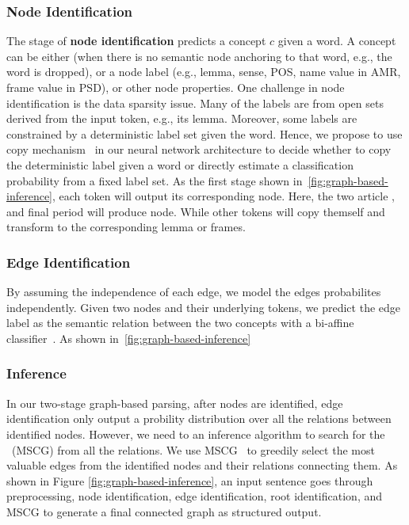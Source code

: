 \subsubsection{Node Identification}
\label{sssec:lex-phr:node-ident}
The stage of \textbf{node identification} predicts a concept $c$ given
a word. A concept can be either \tquoted{$\Phi$} (when there is no
semantic node anchoring to that word, e.g., the word is dropped), or a
node label (e.g., lemma, sense, POS, name value in AMR, frame value in
PSD), or other node properties. One challenge in node identification
is the data sparsity issue. Many of the labels are from open sets
derived from the input token, e.g., its lemma.  Moreover, some labels
are constrained by a deterministic label set given the word. Hence, we
propose to use copy mechanism~\citep{luong2014addressing} in our
neural network architecture to decide whether to copy the
deterministic label given a word or directly estimate a classification
probability from a fixed label set. As the first stage shown
in~\autoref{fig:graph-based-inference}, each token will output its
corresponding node. Here, the two article , 
and final period will produce \tquoted{$\Phi$} node. While other tokens
will copy themself and transform to the corresponding lemma or frames.


\subsubsection{Edge Identification}
\label{sssec:lex-phr:edge-ident}

By assuming the independence of each edge, we model the edges
probabilites independently.  Given two nodes and their underlying
tokens, we predict the edge label as the semantic relation between the
two concepts with a bi-affine classifier~\cite{dozat2016deep}. As
shown in~\autoref{fig:graph-based-inference}

\subsubsection{Inference}
\label{sssec:lex-phr:inference}
In our two-stage graph-based parsing, after nodes are identified, edge
identification only output a probility distribution over all the
relations between identified nodes. However, we need to an inference
algorithm to search for the ~(MSCG) from all the relations. We use
MSCG~\citep{Flanigan:2014vc} to greedily select the most valuable
edges from the identified nodes and their relations connecting
them. As shown in Figure \ref{fig:graph-based-inference}, an input
sentence goes through preprocessing, node identification, edge
identification, root identification, and MSCG to generate a final
connected graph as structured output.

